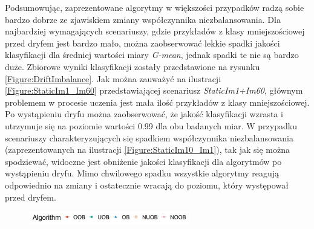Podsumowując, zaprezentowane algorytmy w większości przypadków radzą sobie bardzo dobrze ze zjawiskiem zmiany współczynnika niezbalansowania. Dla najbardziej wymagających scenariuszy, gdzie przykładów z klasy mniejszościowej przed dryfem jest bardzo mało, można zaobserwować lekkie spadki jakości klasyfikacji dla średniej wartości miary \textit{G-mean}, jednak spadki te nie są bardzo duże. Zbiorowe wyniki klasyfikacji zostały przedstawione na rysunku \ref{Figure:DriftImbalance}. Jak można zauważyć na ilustracji \ref{Figure:StaticIm1_Im60} przedstawiającej scenariusz \textit{StaticIm1+Im60}, głównym problemem w procesie uczenia jest mała ilość przykładów z klasy mniejszościowej. Po wystąpieniu dryfu można zaobserwować, że jakość klasyfikacji wzrasta i utrzymuje się na poziomie wartości 0.99 dla obu badanych miar. W przypadku scenariuszy charakteryzujących się spadkiem współczynnika niezbalansowania (zaprezentowanych na ilustracji \ref{Figure:StaticIm10_Im1}), tak jak się można  spodziewać, widoczne jest obniżenie jakości klasyfikacji dla algorytmów po wystąpieniu dryfu. Mimo chwilowego spadku wszystkie algorytmy reagują odpowiednio na zmiany i ostatecznie wracają do poziomu, który występował przed dryfem.

\begin{figure}[h]
    \centering
    \includegraphics[width=7cm]{figures/algorithms_legend.JPG}
\end{figure}

\vspace{-1.2cm}

